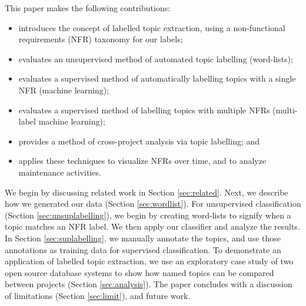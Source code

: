 \documentclass[]{sig-alternate}
\begin{document}
This paper makes the following contributions: 
\begin{itemize}
\item introduces the concept of labelled topic extraction, using a non-functional requirements (NFR) taxonomy for our labels; 
\item evaluates an unsupervised method of automated topic labelling (word-lists);
\item evaluates a supervised method of automatically labelling topics with a single NFR (machine learning);
\item evaluates a supervised method of labelling topics with multiple NFRs (multi-label machine learning);
\item provides a method of cross-project analysis via topic labelling; and
\item applies these techniques to visualize NFRs over time, and to analyze maintenance activities.
\end{itemize}

We begin by discussing related work in Section \ref{sec:related}.
Next, we describe how we generated our data (Section \ref{sec:wordlist}). For unsupervised classification (Section \ref{sec:unsuplabelling}), we begin by creating word-lists to signify when a topic matches an NFR label. We then apply our classifier and analyze the results. %
In Section \ref{sec:suplabelling}, we manually annotate the topics, and use those annotations as training data for supervised classification.  
To demonstrate an application of labelled topic extraction, we use an exploratory case study of two open source database systems to show how named topics can be compared between projects  (Section \ref{sec:analysis}). 
The paper concludes with a discussion of limitations (Section \ref{sec:limit}), and future work.
\end{document}
